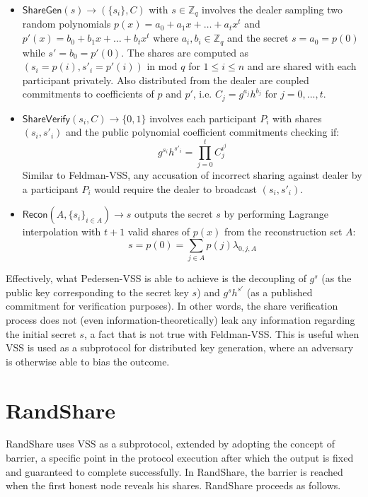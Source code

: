 \documentclass[letterpaper,twocolumn,10pt]{article}
\theoremstyle{definition}
\theoremstyle{remark}
\begin{document}
\begin{itemize}
\item $\mathsf{ShareGen}(s) \rightarrow (\{s_i\}, C)$ with $s \in \mathbb{Z}_q$ involves the dealer sampling two random polynomials $p(x) = a_0 + a_1x+ \ldots+a_tx^t$ and $p'(x) = b_0 + b_1x +\ldots+b_tx^t$ where $a_i, b_i \in \mathbb{Z}_q$ and the secret $s = a_0 = p(0)$ while $s' = b_0 = p'(0)$. The shares are computed as $(s_i = p(i), s'_i = p'(i))$ in mod $q$ for $1 \le i \le n$ and are shared with each participant privately. Also distributed from the dealer are coupled commitments to coefficients of $p$ and $p'$, i.e. $C_j = g^{a_j} h^{b_j}$ for $j = 0, ..., t$.
\item $\mathsf{ShareVerify}(s_i, C) \rightarrow \{0, 1\}$ involves each participant $P_i$ with shares $(s_i, s'_i)$ and the public polynomial coefficient commitments checking if:
$$g^{s_i} h^{s'_i} = \prod_{j = 0}^{t} C_j^{i^j}$$
Similar to Feldman-VSS, any accusation of incorrect sharing against dealer by a participant $P_i$ would require the dealer to broadcast $(s_i, s'_i)$.
\item $\mathsf{Recon}(A, \{s_i\}_{i \in A}) \rightarrow s$ outputs the secret $s$ by performing Lagrange interpolation with $t + 1$ valid shares of $p(x)$ from the reconstruction set $A$:
$$s = p(0) = \sum_{j \in A} p(j) \lambda_{0, j, A}$$
\end{itemize}

Effectively, what Pedersen-VSS is able to achieve is the decoupling of $g^s$ (as the public key corresponding to the secret key $s$) and $g^{s} h^{s'}$ (as a published commitment for verification purposes). In other words, the share verification process does not (even information-theoretically) leak any information regarding the initial secret $s$, a fact that is not true with Feldman-VSS. This is useful when VSS is used as a subprotocol for distributed key generation, where an adversary is otherwise able to bias the outcome.
\fi

\iffalse
\section{RandShare}
\label{appendix:randshare}
RandShare \cite{syta2017scalable} uses VSS as a subprotocol, extended by adopting the concept of barrier, a specific point in the protocol execution after which the output is fixed and guaranteed to complete successfully. In RandShare, the barrier is reached when the first honest node reveals his shares.
RandShare proceeds as follows.
\end{document}
